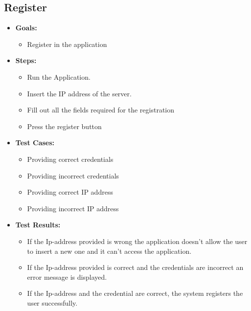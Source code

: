\documentclass{Configuration_Files/PoliMi3i_thesis}
\begin{document}
\subsection{Register}
\begin{itemize}
    \item\textbf{Goals:}
        \begin{itemize}
            \item Register in the application
       \end{itemize}
    \item \textbf{Steps:}
        \begin{itemize}
            \item Run the Application. 
            \item Insert the IP address of the server. 
            \item Fill out all the fields required for the registration
            \item Press the register button
        \end{itemize}
    \item \textbf{Test Cases:}
        \begin{itemize}
            \item Providing correct credentials
            \item Providing incorrect credentials 
            \item Providing correct IP address 
            \item Providing incorrect IP address 
        \end{itemize}
    \item\textbf{Test Results:}
        \begin{itemize}
            \item If the Ip-address provided is wrong the application doesn't allow the user to insert a new one and it can't access the application. 
            \item If the Ip-address provided is correct and the credentials are incorrect an error message is displayed.
             \item If the Ip-address and the credential are correct, the system registers the user successfully. 
        \end{itemize}
\end{itemize}
\end{document}
